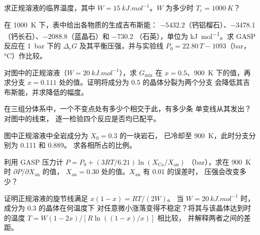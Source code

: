 \begin{exercise}[$\star$]\label{exo:b3:petrological-thermodynamics:4}
求正规溶液的临界温度，其中 $W =
\qty{15}{kJ.mol^{-1}}$。$W$ 为多少时 $T_c = \qty{1000}{K}$？
\end{exercise}

\begin{exercise}[$\star\star$]\label{exo:b3:petrological-thermodynamics:5}
在 \qty{1000}{K} 下，表中给出各物质的生成吉布斯能：
$-5432.2$（钙铝榴石）、$-3478.1$（钙长石）、$-2088.8$（蓝晶石）和 $-730.2$
（石英），单位为 \unit{kJ.mol^{-1}}。求 GASP 反应在
\qty{1}{bar} 下的 $\Delta_rG$ 及其平衡压强，并与实验线
$P_0 = 22.80\,T - 1093$（bar，\unit{\celsius}）作比较。
\end{exercise}

\begin{exercise}[$\star\star$]\label{exo:b3:petrological-thermodynamics:6}
对图中的正规溶液（$W = \qty{20}{kJ.mol^{-1}}$），求
$G_{\text{mix}}$ 在 $x = 0.5$、\qty{900}{K} 下的值，再求分支 $x =
0.111$ 处的值。证明将成分为 0.5 的晶体分裂为两个分支
会降低其吉布斯能，并求降低的幅度。
\end{exercise}

\begin{exercise}[$\star\star$]\label{exo:b3:petrological-thermodynamics:7}
在三组分体系中，一个不变点处有多少个相交于此，有多少条
单变线从其发出？对图中的线束，
逐一检验四个反应是否均已配平。
\end{exercise}

\begin{exercise}[$\star\star$]\label{exo:b3:petrological-thermodynamics:8}
图中正规溶液中全岩成分为 $X_0 = 0.3$ 的一块岩石，
已冷却至 \qty{900}{K}，此时分支分别为 0.111 和 0.889。
求各相所占的比例。
\end{exercise}

\begin{exercise}[$\star\star$]\label{exo:b3:petrological-thermodynamics:9}
利用 GASP 压力计 $P = P_0 + (3RT/6.21)\ln(X_{\text{Ca}}/X_{\text{an}})$
（bar），求在 \qty{900}{K} 时 $\partial P/\partial X_{\text{an}}$ 的值，
$X_{\text{an}} = 0.30$ 处的值。$X_{\text{an}}$ 有 0.01 的误差时，
压强会改变多少？
\end{exercise}

\begin{exercise}[$\star\star\star$]\label{exo:b3:petrological-thermodynamics:10}
证明正规溶液的旋节线满足 $x(1 - x) = RT/(2W)$。
当 $W = \qty{20}{kJ.mol^{-1}}$ 时，成分为 0.3 的晶体在何温度下
对任意微小涨落变得不稳定？将其与该晶体达到时的温度
$T = W(1 - 2x)/[R\ln((1 - x)/x)]$ 相比较，
并解释两者之间的差距。
\end{exercise}

